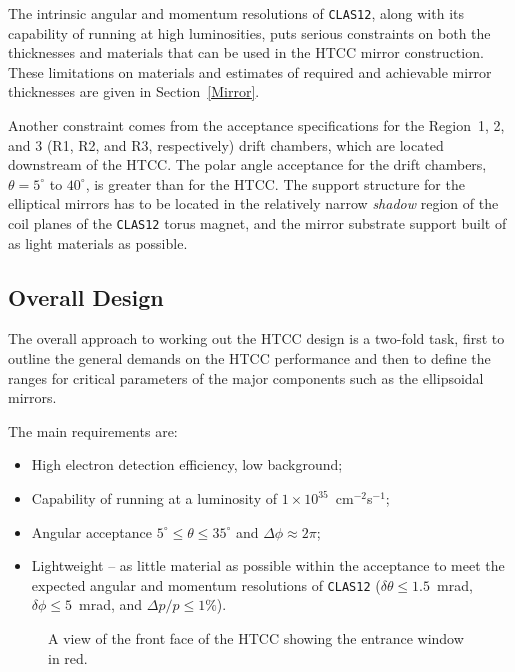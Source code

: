 The intrinsic angular and momentum resolutions of {\tt CLAS12}, along with 
its capability of running at high luminosities, puts serious constraints on 
both the thicknesses and materials that can be used in the HTCC mirror 
construction.  These limitations on materials and estimates of required and 
achievable mirror thicknesses are given in Section~\ref{Mirror}.
 
Another constraint comes from the acceptance specifications for the
Region~1, 2, and 3 (R1, R2, and R3, respectively) drift chambers, which are 
located downstream of the HTCC.  The polar angle acceptance for the drift 
chambers, $\theta = 5^\circ $ to $40^\circ$, is greater than for the HTCC. 
The support structure for the elliptical mirrors has to be located in the 
relatively narrow {\it shadow} region of the coil planes of the {\tt CLAS12} 
torus magnet, and the mirror substrate support built of as light materials 
as possible.
 
\subsection{Overall Design}
\label{Overall design}

The overall approach to working out the HTCC design is a two-fold task,
first to outline the general demands on the HTCC performance and then to 
define the ranges for critical parameters of the major components such 
as the ellipsoidal mirrors.

The main requirements are:

\begin{itemize}
\item High electron detection efficiency, low background;
\item Capability of running at a luminosity of 
$1 \times 10^{35}$~cm$^{-2}$s$^{-1}$;
\item Angular acceptance $5^\circ \leq \theta \leq 35^\circ$ and
$\Delta \phi \approx 2 \pi$;
\item Lightweight -- as little material as possible within the acceptance to 
meet the expected angular and momentum resolutions of {\tt CLAS12} ($\delta 
\theta \leq 1.5$~mrad, $\delta \phi \leq 5$~mrad, and $\Delta p/p \leq 1\%$).
\end{itemize}

\begin{figure}
\begin{center}
\caption{\small{A view of the front face of the HTCC showing the 
entrance window in red.}}
\label{back}
\end{center}
\end{figure} 

